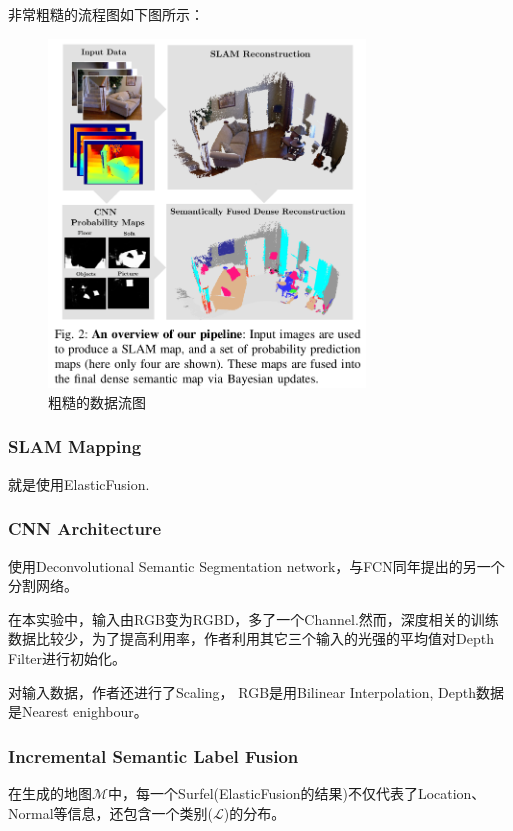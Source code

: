 非常粗糙的流程图如下图所示：
\begin{figure}[!hbtp]
\centering
\includegraphics[width=0.75\textwidth]{SemanticSLAM/SemanticFusion0.png}
\caption{粗糙的数据流图}
\label{SemanticFusion0}
\end{figure}

\subsubsection{SLAM Mapping}
就是使用ElasticFusion.

\subsubsection{CNN Architecture}

使用Deconvolutional Semantic Segmentation network，与FCN同年提出的另一个分割网络。

在本实验中，输入由RGB变为RGBD，多了一个Channel.然而，深度相关的训练数据比较少，为了提高利用率，作者利用其它三个输入的光强的平均值对Depth Filter进行初始化。

对输入数据，作者还进行了Scaling， RGB是用Bilinear Interpolation, Depth数据是Nearest enighbour。

\subsubsection{Incremental Semantic Label Fusion}

在生成的地图$\mathcal{M}$中，每一个Surfel(ElasticFusion的结果)不仅代表了Location、Normal等信息，还包含一个类别($\mathcal{L}$)的分布。

